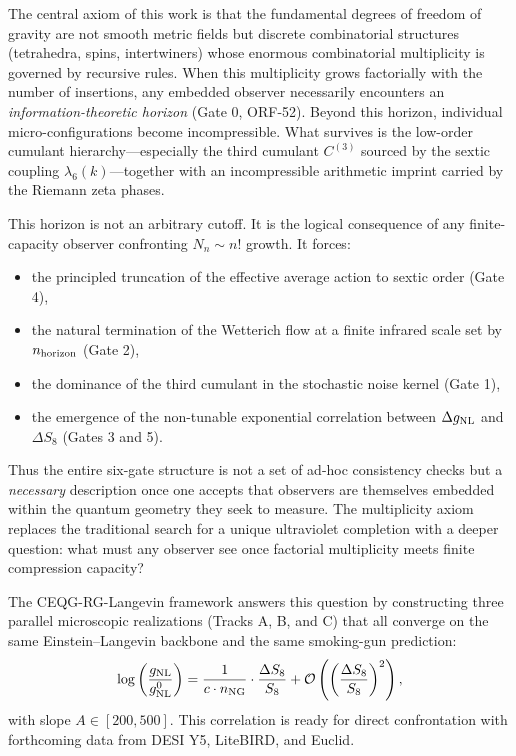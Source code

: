 \documentclass[11pt,a4paper,twoside]{article}
\begin{document}
The central axiom of this work is that the fundamental degrees of freedom of gravity are not smooth metric fields but discrete combinatorial structures (tetrahedra, spins, intertwiners) whose enormous combinatorial multiplicity is governed by recursive rules. When this multiplicity grows factorially with the number of insertions, any embedded observer necessarily encounters an \emph{information-theoretic horizon} (Gate 0, ORF-52). Beyond this horizon, individual micro-configurations become incompressible. What survives is the low-order cumulant hierarchy—especially the third cumulant \(C^{(3)}\) sourced by the sextic coupling \(\lambda_6(k)\)—together with an incompressible arithmetic imprint carried by the Riemann zeta phases.

This horizon is not an arbitrary cutoff. It is the logical consequence of any finite-capacity observer confronting \(N_n \sim n!\) growth. It forces:
\begin{itemize}
    \item the principled truncation of the effective average action to sextic order (Gate 4),
    \item the natural termination of the Wetterich flow at a finite infrared scale set by \(n_{\rm horizon}\) (Gate 2),
    \item the dominance of the third cumulant in the stochastic noise kernel (Gate 1),
    \item the emergence of the non-tunable exponential correlation between \(\Delta g_{\rm NL}\) and \(\Delta S_8\) (Gates 3 and 5).
\end{itemize}

Thus the entire six-gate structure is not a set of ad-hoc consistency checks but a \emph{necessary} description once one accepts that observers are themselves embedded within the quantum geometry they seek to measure. The multiplicity axiom replaces the traditional search for a unique ultraviolet completion with a deeper question: what must any observer see once factorial multiplicity meets finite compression capacity?

The CEQG-RG-Langevin framework answers this question by constructing three parallel microscopic realizations (Tracks A, B, and C) that all converge on the same Einstein–Langevin backbone and the same smoking-gun prediction:
\[
\log\left(\frac{g_{\rm NL}}{g_{\rm NL}^{0}}\right) = \frac{1}{c \cdot n_{\rm NG}} \cdot \frac{\Delta S_8}{S_8} + \mathcal{O}\left(\left(\frac{\Delta S_8}{S_8}\right)^2\right),
\]
with slope \(A \in [200,500]\). This correlation is ready for direct confrontation with forthcoming data from DESI Y5, LiteBIRD, and Euclid.
\end{document}
